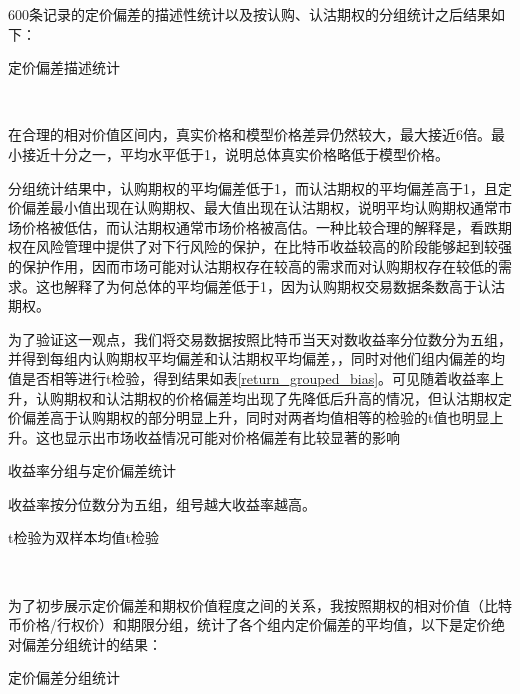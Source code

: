 600条记录的定价偏差的描述性统计以及按认购、认沽期权的分组统计之后结果如下：
~\\
\begin{center}
\begin{threeparttable}[H]
\begin{small}
\caption{定价偏差描述统计}
\label{tab:option_bias_group}
    
    
\end{small} 
\end{threeparttable}
\end{center}
~\\
\par{在合理的相对价值区间内，真实价格和模型价格差异仍然较大，最大接近6倍。最小接近十分之一，平均水平低于1，说明总体真实价格略低于模型价格。}
\par{分组统计结果中，认购期权的平均偏差低于1，而认沽期权的平均偏差高于1，且定价偏差最小值出现在认购期权、最大值出现在认沽期权，说明平均认购期权通常市场价格被低估，而认沽期权通常市场价格被高估。一种比较合理的解释是，看跌期权在风险管理中提供了对下行风险的保护，在比特币收益较高的阶段能够起到较强的保护作用，因而市场可能对认沽期权存在较高的需求而对认购期权存在较低的需求。这也解释了为何总体的平均偏差低于1，因为认购期权交易数据条数高于认沽期权。
\par{为了验证这一观点，我们将交易数据按照比特币当天对数收益率分位数分为五组，并得到每组内认购期权平均偏差和认沽期权平均偏差，，同时对他们组内偏差的均值是否相等进行t检验，得到结果如表\ref{return_grouped_bias}。可见随着收益率上升，认购期权和认沽期权的价格偏差均出现了先降低后升高的情况，但认沽期权定价偏差高于认购期权的部分明显上升，同时对两者均值相等的检验的t值也明显上升。这也显示出市场收益情况可能对价格偏差有比较显著的影响}
\begin{center}
    \begin{threeparttable}[H]
        \caption{收益率分组与定价偏差统计}
        \label{return_grouped_bias}
        
        \begin{tablenotes}
            \footnotesize
            \item 收益率按分位数分为五组，组号越大收益率越高。
            \item t检验为双样本均值t检验
        \end{tablenotes}
    \end{threeparttable}
    
\end{center}
~\\
\par{为了初步展示定价偏差和期权价值程度之间的关系，我按照期权的相对价值（比特币价格/行权价）和期限分组，统计了各个组内定价偏差的平均值，以下是定价绝对偏差分组统计的结果：}
~\\
\begin{center}
\begin{threeparttable}[HT]
\centering
\caption{定价偏差分组统计}
\label{tab:option_bias_group}
\begin{small}


\end{small}
\end{threeparttable}
\end{center}}
